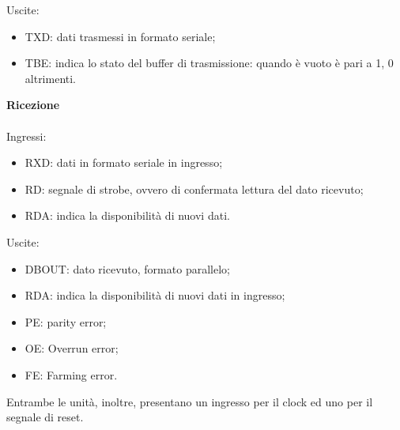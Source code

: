 \documentclass[12pt]{article}
\begin{document}
Uscite:
\begin{itemize}
    \item TXD: dati trasmessi in formato seriale;
    \item TBE: indica lo stato del buffer di trasmissione: quando è vuoto è pari a 1, 0 altrimenti.
\end{itemize}
\vspace{0.5cm}
{\large \textbf{Ricezione}}
\\\\Ingressi:
\begin{itemize}
    \item RXD: dati in formato seriale in ingresso;
    \item RD: segnale di strobe, ovvero di confermata lettura del dato ricevuto;
    \item RDA: indica la disponibilità di nuovi dati.
\end{itemize}
Uscite:
\begin{itemize}
    \item DBOUT: dato ricevuto, formato parallelo;
    \item RDA: indica la disponibilità di nuovi dati in ingresso;
    \item PE: parity error;
    \item OE: Overrun error;
    \item FE: Farming error.
\end{itemize}
Entrambe le unità, inoltre, presentano un ingresso per il clock ed uno per il segnale di reset.
\clearpage
\end{document}
